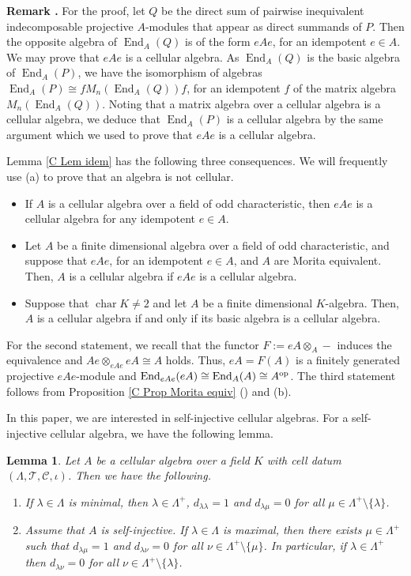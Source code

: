 \documentclass[12pt]{amsart}
\newtheorem{lem}[thm]{Lemma}
\def \remark{\refstepcounter{thm} \par\medskip\noindent
                \textbf{Remark \thethm .} }
\numberwithin{equation}{thm}
\newcommand\cC{\mathcal{C}}
\newcommand\cT{\mathcal{T}}
\newcommand\la{\lambda}
\newcommand\vL{\varLambda}
\newcommand\End{\operatorname{End}}
\newcommand\cha{\operatorname{char}}
\newcounter{ichi}
\newcommand{\roi}{\roman{ichi}}
\newcounter{ni}
\begin{document}
\remark
For the proof, let $Q$ be the direct sum of pairwise inequivalent indecomposable projective $A$-modules that appear 
as direct summands of $P$. Then the opposite algebra of $\End_A(Q)$ is of the form $eAe$, for an idempotent $e\in A$. 
We may prove that $eAe$ is a cellular algebra. As $\End_A(Q)$ is the basic algebra of $\End_A(P)$, we have the isomorphism of algebras
$\End_A(P)\cong fM_n(\End_A(Q))f$, for an idempotent $f$ of the matrix algebra $M_n(\End_A(Q))$. 
Noting that a matrix algebra over a cellular algebra is a cellular algebra, we deduce that $\End_A(P)$ is a cellular algebra by the same argument 
which we used to prove that $eAe$ is a cellular algebra. 


\bigskip

Lemma \ref{C Lem idem} has the following three consequences. We will frequently use (a) to prove that an algebra is not cellular. 

\begin{itemize}
\item[(a)]
If $A$ is a cellular algebra over a field of odd characteristic, then $e A e$ is a cellular algebra for any idempotent $e \in A$.  
\item[(b)]
Let $A$ be a finite dimensional algebra over a field of odd characteristic, 
and suppose that $eAe$, for an idempotent $e \in A$, and $A$ are Morita equivalent. 
Then, $A$ is a cellular algebra if $eAe$ is a cellular algebra. 
\item[(c)]
Suppose that $\cha K \not=2$ and let $A$ be a finite dimensional $K$-algebra. Then, $A$ is a cellular algebra if and only if 
its basic algebra is a cellular algebra.
\end{itemize}
For the second statement, we recall that the functor $F:=eA\otimes_A-$ induces 
the equivalence and $Ae\otimes_{eAe}eA\cong A$ holds. Thus, $eA=F(A)$ is a finitely generated projective $eAe$-module and 
$\End_{eAe}(eA)\cong \End_A(A)\cong A^{\rm op}$. 
The third statement follows from Proposition \ref{C Prop Morita equiv} (\roi) and (b).



\bigskip
In this paper, we are interested in self-injective cellular algebras. 
For a self-injective cellular algebra, we have the following lemma. 

\begin{lem} 
\label{C Lem min}
Let $A$ be a cellular algebra over a field $K$ with cell datum $(\vL, \cT, \cC, \iota)$. 
Then we have the following. 
\begin{enumerate}
\item 
If $\la \in \vL$ is minimal, 
then $\la \in \vL^+$, $d_{\la \la }=1$ and $d_{\la \mu}=0$ for all $\mu \in \vL^+ \setminus \{\la\}$. 

\item 
Assume that $A$ is self-injective. 
If $\la \in \vL$ is maximal, 
then there exists $\mu \in \vL^+$ such that 
$d_{\la \mu}=1$ and $d_{\la \nu}=0$ for all $\nu \in \vL^+ \setminus \{ \mu\}$. 
In particular, if $\la \in \vL^+$ then $d_{\la \nu}=0$ for all $\nu \in \vL^+ \setminus \{ \la\}$.

\end{enumerate} 
\end{lem} 
\end{document}
